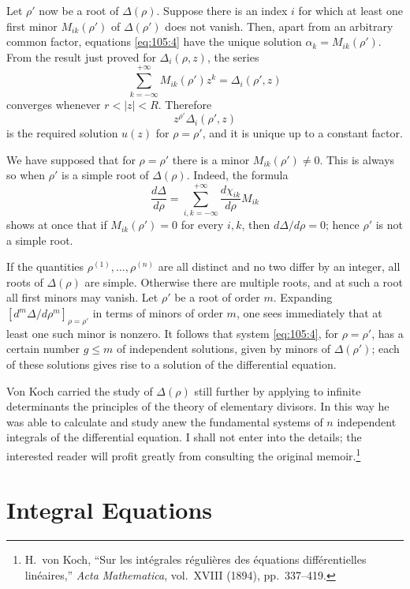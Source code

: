\documentclass[
  paper=b5,
  fontsize=13pt,
  twoside=true,
  open=any,
  bookmarkpackage=false,
  chapterprefix=true,
  headings=normal
]{scrbook}
\theoremstyle{definition}
\begin{document}
Let \(\rho'\) now be a root of \(\Delta(\rho)\).  Suppose there is an index
\(i\) for which at least one first minor \(M_{ik}(\rho')\) of
\(\Delta(\rho')\) does not vanish.  Then, apart from an arbitrary common
factor, equations \eqref{eq:105:4} have the unique solution
\(\alpha_k=M_{ik}(\rho')\).  From the result just proved for
\(\Delta_i(\rho,z)\), the series
\[
  \sum_{k=-\infty}^{+\infty}M_{ik}(\rho')z^k
  =\Delta_i(\rho',z)
\]
converges
whenever \(r<|z|<R\).  Therefore
\[
  z^{\rho'}\Delta_i(\rho',z)
\]
is the required solution \(u(z)\) for \(\rho=\rho'\), and it is unique up to
a constant factor.

We have supposed that for \(\rho=\rho'\) there is a minor
\(M_{ik}(\rho')\ne0\).  This is always so when \(\rho'\) is a simple root of
\(\Delta(\rho)\).  Indeed, the formula
\[
  \frac{d\Delta}{d\rho}
  =\sum_{i,k=-\infty}^{+\infty}
  \frac{d\chi_{ik}}{d\rho}M_{ik}
\]
shows at once that if \(M_{ik}(\rho')=0\) for every \(i,k\), then
\(d\Delta/d\rho=0\); hence \(\rho'\) is not a simple root.

If the quantities \(\rho^{(1)},\ldots,\rho^{(n)}\) are all distinct and no
two differ by an integer, all roots of \(\Delta(\rho)\) are simple.  Otherwise
there are multiple roots, and at such a root all first minors may vanish.  Let
\(\rho'\) be a root of order \(m\).  Expanding
\(\left[d^m\Delta/d\rho^m\right]_{\rho=\rho'}\) in terms of minors of order
\(m\), one sees immediately that at least one such minor is nonzero.  It
follows that system \eqref{eq:105:4}, for
\(\rho=\rho'\), has a certain number \(g\le m\) of independent solutions,
given by minors of \(\Delta(\rho')\); each of these solutions gives rise to a
solution of the differential equation.

Von Koch carried the study of \(\Delta(\rho)\) still further by applying to
infinite determinants the principles of the theory of elementary divisors.
In this way he was able to calculate and study anew the fundamental systems of
\(n\) independent integrals of the differential equation.  I shall not enter
into the details; the interested reader will profit greatly from consulting
the original memoir.\footnote{H.~von Koch, ``Sur les intégrales régulières des
équations différentielles linéaires,'' \emph{Acta Mathematica}, vol.~XVIII
(1894), pp.~337--419.}

\section{Integral Equations}
\end{document}
